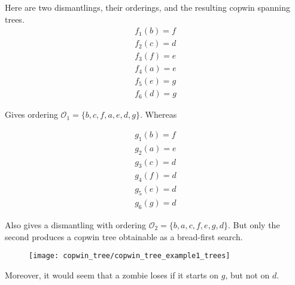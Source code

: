 Here are two dismantlings, their orderings, and the resulting copwin spanning trees.
\begin{align*}
  f_1(b) = f \\
  f_2(c) = d \\
  f_3(f) = e \\
  f_4(a) = e \\
  f_5(e) = g \\
  f_6(d) = g
\end{align*}

Gives ordering $\mathcal{O}_1 = \{ b, c, f, a, e, d, g \}$. Whereas

\begin{align*}
  g_1(b) = f \\
  g_2(a) = e \\
  g_3(c) = d \\
  g_4(f) = d \\
  g_5(e) = d \\
  g_6(g) = d
\end{align*}

Also gives a dismantling with ordering $\mathcal{O}_2 = \{b, a, c, f, e, g, d \}$.
But only the second produces a copwin tree obtainable as a bread-first search.

\begin{figure}[h!]
\centering
\texttt{[image: copwin\_tree/copwin\_tree\_example1\_trees]}
\end{figure}

Moreover, it would seem that a zombie loses if it starts on $g$, but not on $d$.
